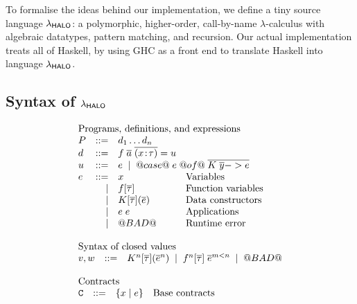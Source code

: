 To formalise the ideas behind our implementation, we define a
tiny source language $\lambda_{\sf HALO}$:
a polymorphic, higher-order, call-by-name $\lambda$-calculus with
algebraic datatypes, pattern matching, and recursion.
Our actual implementation treats all of Haskell, by using GHC as a front
end to translate Haskell into language $\lambda_{\sf HALO}$.


\subsection{Syntax of $\lambda_{\sf HALO}$} \label{s:syntax}

\begin{figure}
\[\begin{array}{l}
\begin{array}{lrll}
\multicolumn{4}{l}{\text{Programs, definitions, and expressions}} \\
P   & ::= & d_1 \ldots d_n \\
d   & ::= & f\; \ol{a} \; \ol{(x\!:\!\tau)} = u \\
u   & ::= & \multicolumn{2}{l}{e \; \mid \; @case@\;e\;@of@\;\ol{K\;\ol{y} -> e}} \\
e  & ::=  & x            & \text{Variables} \\
   & \mid & f[\ol{\tau}] & \text{Function variables} \\
   & \mid & K[\ol{\tau}](\ol{e}) & \text{Data constructors} \\
   & \mid & e\;e         & \text{Applications} \\
   & \mid & @BAD@        & \text{Runtime error} \\
\end{array}\\ \\
\begin{array}{lrll}
\multicolumn{3}{l}{\text{Syntax of closed values}} \\
 v,w & ::= & K^\ar[\ol{\tau}](\oln{e}{\ar}) \;\mid\; f^\ar[\ol{\tau}]\;\oln{e}{m < \ar} \;\mid\; @BAD@ \\ \\
\end{array}
\\
\begin{array}{lrll}
\multicolumn{3}{l}{\text{Contracts}} \\
 \Ct & ::=  & \{ x \mid e \}        & \text{Base contracts}  \\

\end{array}
\end{array}\]
\end{figure}
